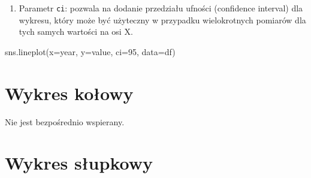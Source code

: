 \documentclass[
  polish,
  letterpaper,
  DIV=11,
  numbers=noendperiod]{scrreprt}
\newenvironment{Shaded}{\begin{snugshade}}{\end{snugshade}}
\newcommand{\DecValTok}[1]{\textcolor[rgb]{0.68,0.00,0.00}{#1}}
\newcommand{\NormalTok}[1]{\textcolor[rgb]{0.00,0.23,0.31}{#1}}
\newcommand{\OperatorTok}[1]{\textcolor[rgb]{0.37,0.37,0.37}{#1}}
\newcommand{\StringTok}[1]{\textcolor[rgb]{0.13,0.47,0.30}{#1}}
\providecommand{\tightlist}{%
  \setlength{\itemsep}{0pt}\setlength{\parskip}{0pt}}
\begin{document}
\begin{enumerate}
\def\labelenumi{\arabic{enumi}.}
\setcounter{enumi}{3}
\tightlist
\item
  Parametr \texttt{ci}: pozwala na dodanie przedziału ufności
  (confidence interval) dla wykresu, który może być użyteczny w
  przypadku wielokrotnych pomiarów dla tych samych wartości na osi X.
\end{enumerate}

\begin{Shaded}
\begin{Highlighting}[]
\NormalTok{sns.lineplot(x}\OperatorTok{=}\StringTok{\textquotesingle{}year\textquotesingle{}}\NormalTok{, y}\OperatorTok{=}\StringTok{\textquotesingle{}value\textquotesingle{}}\NormalTok{, ci}\OperatorTok{=}\DecValTok{95}\NormalTok{, data}\OperatorTok{=}\NormalTok{df)}
\end{Highlighting}
\end{Shaded}

\section{Wykres kołowy}\label{wykres-koux142owy}

Nie jest bezpośrednio wspierany.

\section{Wykres słupkowy}\label{wykres-sux142upkowy}
\end{document}
